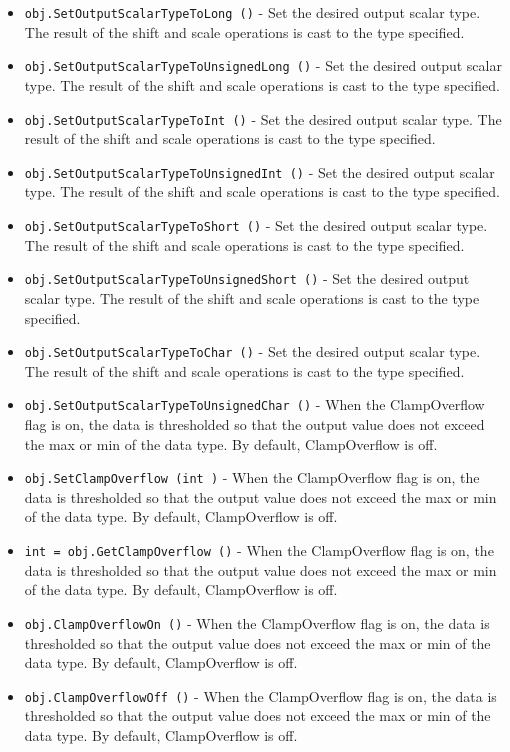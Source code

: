 \begin{itemize}
\item  \verb|obj.SetOutputScalarTypeToLong ()| -  Set the desired output scalar type. The result of the shift 
 and scale operations is cast to the type specified.

\item  \verb|obj.SetOutputScalarTypeToUnsignedLong ()| -  Set the desired output scalar type. The result of the shift 
 and scale operations is cast to the type specified.

\item  \verb|obj.SetOutputScalarTypeToInt ()| -  Set the desired output scalar type. The result of the shift 
 and scale operations is cast to the type specified.

\item  \verb|obj.SetOutputScalarTypeToUnsignedInt ()| -  Set the desired output scalar type. The result of the shift 
 and scale operations is cast to the type specified.

\item  \verb|obj.SetOutputScalarTypeToShort ()| -  Set the desired output scalar type. The result of the shift 
 and scale operations is cast to the type specified.

\item  \verb|obj.SetOutputScalarTypeToUnsignedShort ()| -  Set the desired output scalar type. The result of the shift 
 and scale operations is cast to the type specified.

\item  \verb|obj.SetOutputScalarTypeToChar ()| -  Set the desired output scalar type. The result of the shift 
 and scale operations is cast to the type specified.

\item  \verb|obj.SetOutputScalarTypeToUnsignedChar ()| -  When the ClampOverflow flag is on, the data is thresholded so that
 the output value does not exceed the max or min of the data type.
 By default, ClampOverflow is off.

\item  \verb|obj.SetClampOverflow (int )| -  When the ClampOverflow flag is on, the data is thresholded so that
 the output value does not exceed the max or min of the data type.
 By default, ClampOverflow is off.

\item  \verb|int = obj.GetClampOverflow ()| -  When the ClampOverflow flag is on, the data is thresholded so that
 the output value does not exceed the max or min of the data type.
 By default, ClampOverflow is off.

\item  \verb|obj.ClampOverflowOn ()| -  When the ClampOverflow flag is on, the data is thresholded so that
 the output value does not exceed the max or min of the data type.
 By default, ClampOverflow is off.

\item  \verb|obj.ClampOverflowOff ()| -  When the ClampOverflow flag is on, the data is thresholded so that
 the output value does not exceed the max or min of the data type.
 By default, ClampOverflow is off.

\end{itemize}
